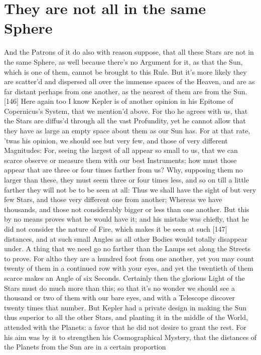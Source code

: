 \documentclass[letterpaper]{book}
\begin{document}
\section{They are not all in the same Sphere}

And the Patrons of it do also with reason suppose, that all these Stars are
not in the same Sphere, as well because there's no Argument for it, as that
the Sun, which is one of them, cannot be brought to this Rule. But it's
more likely they are scatter'd and dispersed all over the immense spaces of
the Heaven, and are as far distant perhaps from one another, as the nearest
of them are from the Sun.
[146] Here again too I know Kepler is of another opinion in his Epitome
of Copernicus's System, that we mention'd above. For tho he agrees with
us, that the Stars are diffus'd through all the vast Profundity, yet he cannot
allow that they have as large an empty space about them as our Sun has.
For at that rate, 'twas his opinion, we should see but very few, and those of
very different Magnitudes: For, seeing the largest of all appear so small to
us, that we can scarce observe or measure them with our best Instruments;
how must those appear that are three or four times farther from us? Why,
supposing them no larger than these, they must seem three or four times
less, and so on till a little farther they will not be to be seen at all: Thus we
shall have the sight of but very few Stars, and those very different one from
another; Whereas we have thousands, and those not considerably bigger or
less than one another. But this by no means proves what he would have
it; and his mistake was chiefly, that he did not consider the nature of Fire,
which makes it be seen at such [147] distances, and at such small Angles as
all other Bodies would totally disappear under. A thing that we need go no
farther than the Lamps set along the Streets to prove. For altho they are
a hundred foot from one another, yet you may count twenty of them in a
continued row with your eyes, and yet the twentieth of them scarce makes
an Angle of six Seconds. Certainly then the glorious Light of the Stars must
do much more than this; so that it's no wonder we should see a thousand
or two of them with our bare eyes, and with a Telescope discover twenty
times that number. But Kepler had a private design in making the Sun
thus superior to all the other Stars, and planting it in the middle of the
World, attended with the Planets: a favor that he did not desire to grant
the rest. For his aim was by it to strengthen his Cosmographical Mystery,
that the distances of the Planets from the Sun are in a certain proportion
\end{document}

